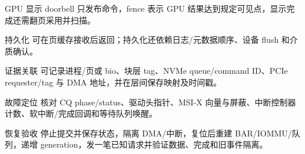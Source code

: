 \begin{chapteranswer}{GPU 显示}
doorbell 只发布命令，fence 表示 GPU 结果达到规定可见点，显示完成还需翻页采用并扫描。
\end{chapteranswer}

\begin{chapteranswer}{持久化}
 可在页缓存接收后返回；持久化还依赖日志/元数据顺序、设备 flush 和介质确认。
\end{chapteranswer}

\begin{chapteranswer}{证据关联}
可记录进程/页或 bio、块层 tag、NVMe queue/command ID、PCIe requester/tag 与 DMA 地址，并在层间保存映射及时间戳。
\end{chapteranswer}

\begin{chapteranswer}{故障定位}
核对 CQ phase/status、驱动头指针、MSI-X 向量与屏蔽、中断控制器计数、软中断/完成回调和等待队列唤醒。
\end{chapteranswer}

\begin{chapteranswer}{恢复验收}
停止提交并保存状态，隔离 DMA/中断，复位后重建 BAR/IOMMU/队列，递增 generation，发一笔已知请求并验证数据、完成和旧事件隔离。
\end{chapteranswer}
